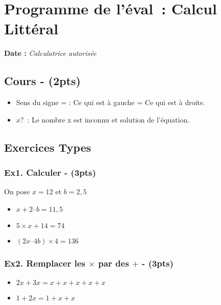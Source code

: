 



\section*{Programme de l’éval : Calcul Littéral}

\textbf{Date : } \hspace{4cm} \textit{Calculatrice autorisée}

\subsection*{Cours - (2pts)}


\begin{itemize}[label={$\bullet$}]
  \item Sens du signe = : Ce qui est à gauche = Ce qui est à droite. 
  \item $x ?$ : Le nombre x est inconnu et solution de l’équation. 
\end{itemize}


\subsection*{Exercices Types}


\subsubsection*{Ex1. Calculer  - (3pts)}

On pose $x = 12$ et $b = 2,5$
\begin{itemize}[label={$\bullet$}]
  \item  $x + 2 – b = 11,5$
  \item  $5 \times x + 14 = 74$
  \item  $(2x – 4b) \times 4 = 136$
\end{itemize}

\subsubsection*{Ex2. Remplacer les $\times$ par des $+$ - (3pts)}

\begin{itemize}[label={$\bullet$}]
  \item  $2x + 3x = x+x + x+x+x$
  \item  $1 + 2x = 1 + x + x$        
\end{itemize}

